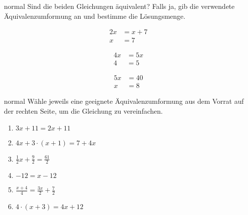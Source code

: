 \documentclass[../lineare_gleichungen.tex]{subfiles}
\begin{document}
    \begin{exercise}{normal}
        Sind die beiden Gleichungen äquivalent? Falls ja, gib die verwendete Äquivalenzumformung an und bestimme die Lösungsmenge.
        \begin{enumerate}
        \begin{multicols}{3}
            \item
            \begin{align*}
                2x&=x+7\\
                x&=7
            \end{align*}

            \item
            \begin{align*}
                4x&=5x\\
                4&=5
            \end{align*}

            \item
            \begin{align*}
                5x&=40\\
                x&=8
            \end{align*}
        \end{multicols}
    \end{enumerate}
    \end{exercise}
    \begin{exercise}{normal}
        Wähle jeweils eine geeignete Äquivalenzumformung aus dem Vorrat auf der rechten Seite, um die Gleichung zu vereinfachen.
        \begin{multicols}{3}
            \begin{enumerate}
                \item $3x+11=2x+11$
                \item $4x+3\cdot (x+1)=7+4x$
                \item $\frac{1}{2}x+\frac{9}{2}=\frac{61}{2}$
                \item $-12=x-12$
                \item $\frac{x+4}{4}=\frac{3x}{2}+\frac{7}{2}$
                \item $4\cdot (x+3)=4x+12$
            \end{enumerate}
        \end{multicols}
    \end{exercise}
\end{document}
